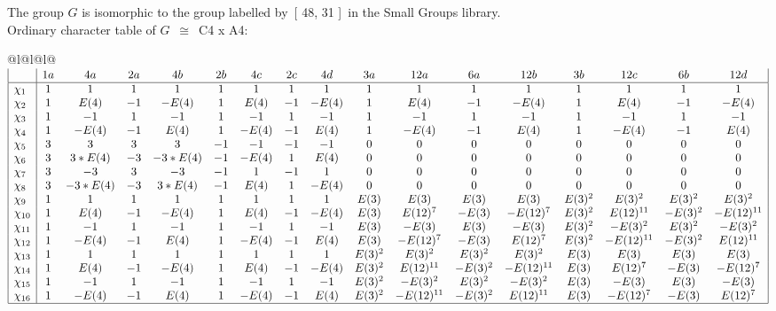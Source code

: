 \documentclass[varwidth=\maxdimen,border=10]{standalone}
\begin{document}
The group $G$ is isomorphic to the group labelled by\ [ 48, 31 ]\ in the Small Groups library.\\
Ordinary character table of $G$\ $\cong$\ C4 x A4:\\
\begin{center}
\begin{tabular}{@{}l@{}l@{}l@{}}
\hline
\(\begin{array}{|l|cccccccccccccccc|}
  & 1a & 4a & 2a & 4b & 2b & 4c & 2c & 4d & 3a & 12a & 6a & 12b & 3b & 12c & 6b & 12d\\ \hline
\chi_{1} & 1 & 1 & 1 & 1 & 1 & 1 & 1 & 1 & 1 & 1 & 1 & 1 & 1 & 1 & 1 & 1\\
\chi_{2} & 1 & E(4) & -1 & -E(4) & 1 & E(4) & -1 & -E(4) & 1 & E(4) & -1 & -E(4) & 1 & E(4) & -1 & -E(4)\\
\chi_{3} & 1 & -1 & 1 & -1 & 1 & -1 & 1 & -1 & 1 & -1 & 1 & -1 & 1 & -1 & 1 & -1\\
\chi_{4} & 1 & -E(4) & -1 & E(4) & 1 & -E(4) & -1 & E(4) & 1 & -E(4) & -1 & E(4) & 1 & -E(4) & -1 & E(4)\\
\chi_{5} & 3 & 3 & 3 & 3 & -1 & -1 & -1 & -1 & 0 & 0 & 0 & 0 & 0 & 0 & 0 & 0\\
\chi_{6} & 3 & 3*E(4) & -3 & -3*E(4) & -1 & -E(4) & 1 & E(4) & 0 & 0 & 0 & 0 & 0 & 0 & 0 & 0\\
\chi_{7} & 3 & -3 & 3 & -3 & -1 & 1 & -1 & 1 & 0 & 0 & 0 & 0 & 0 & 0 & 0 & 0\\
\chi_{8} & 3 & -3*E(4) & -3 & 3*E(4) & -1 & E(4) & 1 & -E(4) & 0 & 0 & 0 & 0 & 0 & 0 & 0 & 0\\
\chi_{9} & 1 & 1 & 1 & 1 & 1 & 1 & 1 & 1 & E(3) & E(3) & E(3) & E(3) & E(3)^{2} & E(3)^{2} & E(3)^{2} & E(3)^{2}\\
\chi_{10} & 1 & E(4) & -1 & -E(4) & 1 & E(4) & -1 & -E(4) & E(3) & E(12)^{7} & -E(3) & -E(12)^{7} & E(3)^{2} & E(12)^{11} & -E(3)^{2} & -E(12)^{11}\\
\chi_{11} & 1 & -1 & 1 & -1 & 1 & -1 & 1 & -1 & E(3) & -E(3) & E(3) & -E(3) & E(3)^{2} & -E(3)^{2} & E(3)^{2} & -E(3)^{2}\\
\chi_{12} & 1 & -E(4) & -1 & E(4) & 1 & -E(4) & -1 & E(4) & E(3) & -E(12)^{7} & -E(3) & E(12)^{7} & E(3)^{2} & -E(12)^{11} & -E(3)^{2} & E(12)^{11}\\
\chi_{13} & 1 & 1 & 1 & 1 & 1 & 1 & 1 & 1 & E(3)^{2} & E(3)^{2} & E(3)^{2} & E(3)^{2} & E(3) & E(3) & E(3) & E(3)\\
\chi_{14} & 1 & E(4) & -1 & -E(4) & 1 & E(4) & -1 & -E(4) & E(3)^{2} & E(12)^{11} & -E(3)^{2} & -E(12)^{11} & E(3) & E(12)^{7} & -E(3) & -E(12)^{7}\\
\chi_{15} & 1 & -1 & 1 & -1 & 1 & -1 & 1 & -1 & E(3)^{2} & -E(3)^{2} & E(3)^{2} & -E(3)^{2} & E(3) & -E(3) & E(3) & -E(3)\\
\chi_{16} & 1 & -E(4) & -1 & E(4) & 1 & -E(4) & -1 & E(4) & E(3)^{2} & -E(12)^{11} & -E(3)^{2} & E(12)^{11} & E(3) & -E(12)^{7} & -E(3) & E(12)^{7}\\
\hline
\end{array}\)\\
\end{tabular}
\end{center}
\end{document}
